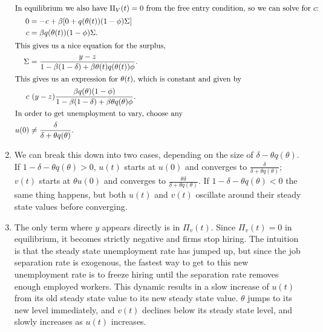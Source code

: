 \documentclass[11pt]{article}
\begin{document}
\begin{enumerate}
\begin{align}
\intertext{In equilibrium we also have $\Pi_V(t) = 0$ from the free entry condition, so we can solve for $c$:}
0 &= -c + \beta[0 + q(\theta(t)) (1 - \phi)\Sigma]\\
c &= \beta q(\theta (t)) (1 - \phi)\Sigma.\\
\intertext{This gives us a nice equation for the surplus,}
\Sigma &= \frac{y - z}{1 - \beta(1 - \delta) + \beta \theta(t) q(\theta(t)) \phi}.\\
\intertext{This gives us an expression for $\theta(t)$, which is constant and given by}
 c &\ (y - z) \frac{\beta q(\theta)(1 - \phi)}{1 - \beta(1 - \delta) + \beta \theta q (\theta) \phi}.\\
\intertext{In order to get unemployment to vary, choose any}
u(0) &\neq \frac{\delta}{\delta + \theta q (\theta)}.
\end{align}
\item
We can break this down into two cases, depending on the size of $\delta - \theta q (\theta)$. If $1 - \delta - \theta q (\theta) >0$, $u(t)$ starts at $u(0)$ and converges to $\frac{\delta}{\delta + \theta q(\theta)}$; $v(t)$ starts at $\theta u(0)$ and converges to $\frac{\theta \delta}{\delta + \theta q(\theta)}$. If $1 - \delta - \theta q(\theta) < 0$ the same thing happens, but both $u(t)$ and $v(t)$ oscillate around their steady state values before converging.
\item
The only term where $y$ appears directly is in $\Pi_v (t)$. Since $\Pi_v (t) = 0$ in equilibrium, it becomes strictly negative and firms stop hiring. The intuition is that the steady state unemployment rate has jumped up, but since the job separation rate is exogenous, the fastest way to get to this new unemployment rate is to freeze hiring until the separation rate removes enough employed workers. This dynamic results in a slow increase of $u(t)$ from its old steady state value to its new steady state value. $\theta$ jumps to its new level immediately, and $v(t)$ declines below its steady state level, and slowly increases as $u(t)$ increases.
\end{enumerate}

\newpage
\end{document}
